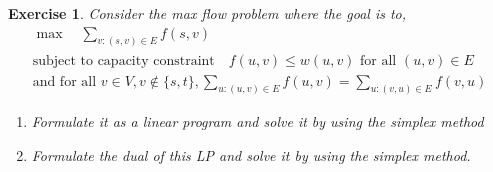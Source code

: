 \documentclass[12pt]{article}
\theoremstyle{colon}
\newtheorem{exercise}{Exercise}
\begin{document}
\clearpage

\begin{exercise}
  Consider the max flow problem where the goal is to,
  \begin{gather*}
    \max \quad \sum_{v: (s,v)\in E} f(s,v) \\
    \text{subject to capacity constraint} \quad f(u,v) \leq w(u,v) \text{ for all } (u,v) \in E \\
    \text{and for all } v \in V, v \notin \{ s,t \}, \sum_{u: (u,v) \in E} f(u,v) =  \sum_{u: (v,u) \in E} f(v,u)
  \end{gather*}
  \begin{enumerate}[label=\arabic*)]
    \item Formulate it as a linear program and solve it by using the simplex method
    \item Formulate the dual of this LP and solve it by using the simplex method.
  \end{enumerate}
\end{exercise}
\end{document}
